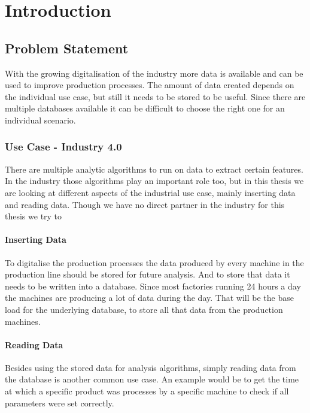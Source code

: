 \chapter{Introduction}
\label{ch:introduction}


\section{Problem Statement}
With the growing digitalisation of the industry more data is available and can be used to improve production processes.
The amount of data created depends on the individual use case,
but still it needs to be stored to be useful.
Since there are multiple databases available it can be difficult to choose the right one for an individual scenario.

\subsection{Use Case - Industry 4.0}
There are multiple analytic algorithms to run on data to extract certain features.
In the industry those algorithms play an important role too,
but in this thesis we are looking at different aspects of the industrial use case,
mainly inserting data and reading data.
Though we have no direct partner in the industry for this thesis we try to 

\subsubsection{Inserting Data}
To digitalise the production processes the data produced by every machine in the production line should be stored for future analysis.
And to store that data it needs to be written into a database.
Since most factories running 24 hours a day the machines are producing a lot of data during the day.
That will be the base load for the underlying database, to store all that data from the production machines.

\subsubsection{Reading Data}
Besides using the stored data for analysis algorithms,
simply reading data from the database is another common use case.
An example would be to get the time at which a specific product was processes by a specific machine to check if all parameters were set correctly.

